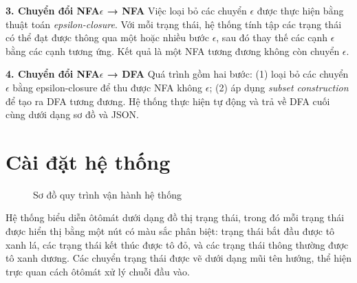 \documentclass[12pt,a4paper]{report}
\begin{document}
\textbf{3. Chuyển đổi NFA$\epsilon$ → NFA}
Việc loại bỏ các chuyển $\epsilon$ được thực hiện bằng thuật toán \textit{epsilon-closure}. Với mỗi trạng thái, hệ thống tính tập các trạng thái có thể đạt được thông qua một hoặc nhiều bước $\epsilon$, sau đó thay thế các cạnh $\epsilon$ bằng các cạnh tương ứng. Kết quả là một NFA tương đương không còn chuyển $\epsilon$.

\textbf{4. Chuyển đổi NFA$\epsilon$ → DFA}
Quá trình gồm hai bước: (1) loại bỏ các chuyển $\epsilon$ bằng epsilon-closure để thu được NFA không $\epsilon$; (2) áp dụng \textit{subset construction} để tạo ra DFA tương đương. Hệ thống thực hiện tự động và trả về DFA cuối cùng dưới dạng sơ đồ và JSON.



\section{Cài đặt hệ thống}
\begin{figure}[H]
\centering
{}
\caption{Sơ đồ quy trình vận hành hệ thống}
\label{fig:flow_system}
\end{figure}
\hspace*{0.7cm}Hệ thống biểu diễn ôtômát dưới dạng đồ thị trạng thái, trong đó mỗi trạng thái được hiển thị bằng một nút có màu sắc phân biệt: trạng thái bắt đầu được tô xanh lá, các trạng thái kết thúc được tô đỏ, và các trạng thái thông thường được tô xanh dương. Các chuyển trạng thái được vẽ dưới dạng mũi tên hướng, thể hiện trực quan cách ôtômát xử lý chuỗi đầu vào.
\end{document}
